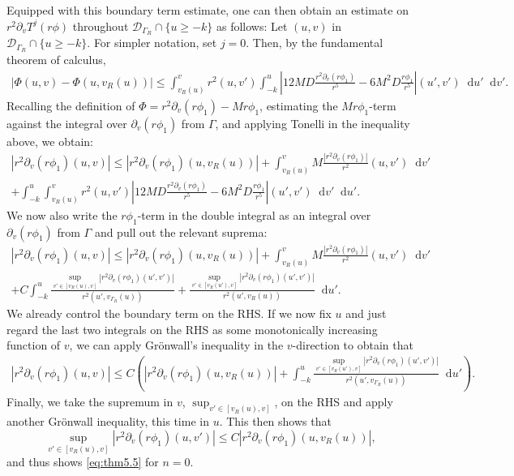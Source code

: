 \documentclass[11pt,english]{article}
\numberwithin{equation}{section}
\theoremstyle{remark}
\theoremstyle{plain}
\newenvironment{nalign}{
    \begin{equation}
    \begin{aligned}
}{
    \end{aligned}
    \end{equation}
    \ignorespacesafterend
}
\theoremstyle{remark}
\newcommand{\dd}{\mathop{}\!\mathrm{d}}
\newcommand{\pv}{\partial_v}
\renewcommand{\(}{\left(}
\renewcommand{\)}{\right)}
\begin{document}
Equipped with this boundary term estimate, one can then obtain an estimate on $r^2\pv T^j(r\phi)$ throughout $\mathcal D_{\Gamma_R}\cap\{u\geq -k\}$ as follows: Let $(u,v)$ in $\mathcal D_{\Gamma_R}\cap\{u\geq -k\}$. For simpler notation, set $j=0$. Then, by the fundamental theorem of calculus,
\begin{align}
\left|\Phi(u,v)-\Phi(u,v_{R}(u))\right|\leq\int_{v_{R}(u)}^v r^2(u,v')\int_{-k}^u \left|	12MD\frac{r^2\pv(r\phi_1)}{r^5}-6M^2 D\frac{r\phi_1}{r^5}	\right|(u',v')\dd u'\dd v'.
\end{align}
Recalling the definition of $\Phi=r^2\pv(r\phi_1)-Mr\phi_1$, estimating the $Mr\phi_1$-term against the integral over $\pv(r\phi_1)$ from $\Gamma$, and applying Tonelli in the inequality above, we obtain:
\begin{multline}
|r^2\pv(r\phi_1)(u,v)|\leq  \left|r^2\pv(r\phi_1)(u,v_{R}(u))\right|+\int_{v_{R}(u)}^vM \frac{|r^2\pv(r\phi_1)|}{r^2}(u,v')\dd v'\\
+
\int_{-k}^u\int_{v_{R}(u)}^v r^2(u,v') \left|	12MD\frac{r^2\pv(r\phi_1)}{r^5}-6M^2 D\frac{r\phi_1}{r^5}	\right|(u',v')\dd v'\dd u'.
\end{multline}
We now also write the $r\phi_1$-term in the double integral as an integral over $\pv(r\phi_1)$ from $\Gamma$ and pull out the relevant suprema:
\begin{multline}
|r^2\pv(r\phi_1)(u,v)|\leq  \left|r^2\pv(r\phi_1)(u,v_{R}(u))\right|+\int_{v_{R}(u)}^v M\frac{|r^2\pv(r\phi_1)|}{r^2}(u,v')\dd v'\\
+
C\int_{-k}^u\frac{\sup_{v'\in[v_{R}(u),v]} |r^2\pv(r\phi_1)(u',v')|}{r^2(u',v_{\Gamma_R}(u))} + \frac{ \sup_{v'\in[v_{R}(u'),v]}|r^2\pv(r\phi_1)(u',v')|}{r^2(u',v_{R}(u))} \dd u'.
\end{multline}
We already control the  boundary  term on the RHS. 
If we now fix $u$ and just regard the last two integrals on the RHS as some monotonically increasing function of $v$, we can apply Gr\"onwall's inequality in the $v$-direction to obtain that
\begin{nalign}
|r^2\pv(r\phi_1)(u,v)|\leq  C\left(\left|r^2\pv(r\phi_1)(u,v_{R}(u))\right|
+
\int_{-k}^u \frac{ \sup_{v'\in[v_{R}(u'),v]}|r^2\pv(r\phi_1)(u',v')|}{r^2(u',v_{\Gamma_R}(u))} \dd u'\right).
\end{nalign}
Finally, we take the supremum in $v$, $\sup_{v'\in[v_R(u),v]}$, on the RHS and apply another Gr\"onwall inequality, this time in $u$. This then shows that
\begin{equation}
\sup_{v'\in[v_{R}(u),v]}|r^2\pv(r\phi_1)(u,v')|\leq  C\left|r^2\pv(r\phi_1)(u,v_{R}(u))\right|,
\end{equation}
and thus shows \eqref{eq:thm5.5} for $n=0$. 
\end{document}
